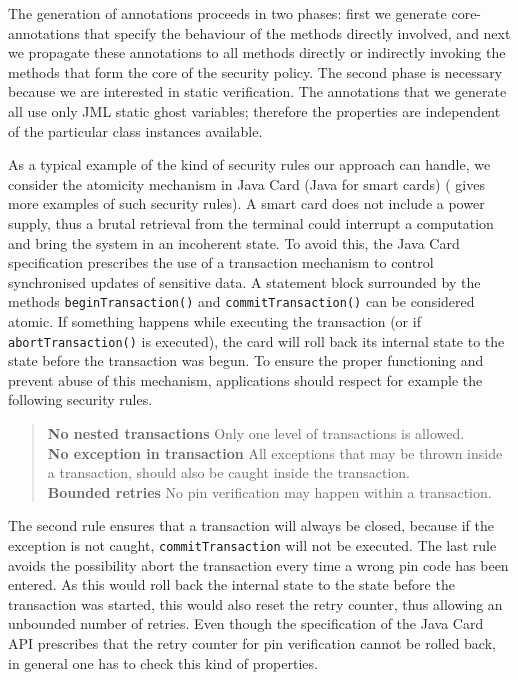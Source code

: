 The generation of annotations proceeds in two phases: first we
generate core-annotations that specify the behaviour of the methods
directly involved, and next we propagate these annotations to all
methods directly or indirectly invoking the methods that form the core
of the security policy. The second phase is necessary because we are
interested in static verification. The annotations that we generate
all use only JML static ghost variables; therefore the properties are
independent of the particular class instances available. 

As a typical example of the kind of security rules our approach can
handle, we consider the atomicity mechanism in Java Card (Java for
smart cards) (\cite{PavlovaBBHL04cardis} gives more examples of such
security rules). A smart card does not include a power supply, thus a
brutal retrieval from the terminal could interrupt a computation and
bring the system in an incoherent state. To avoid this, the Java Card
specification prescribes the use of a transaction mechanism to control
synchronised updates of sensitive data. A statement block surrounded
by the methods \texttt{beginTransaction()} and
\texttt{commitTransaction()} can be considered atomic.
If something happens while executing the transaction (or if
\texttt{abortTransaction()} is executed), the card will
roll back its internal state to the state before the transaction was
begun. To ensure the proper functioning and prevent abuse of this
mechanism, applications should respect for example the following
security rules. 

\begin{quote}
\textbf{No nested transactions} Only one level of transactions
is allowed.\smallskip\\
\textbf{No exception in transaction} All exceptions that may be thrown
inside a transaction, should also be caught inside the
transaction.\smallskip\\
\textbf{Bounded retries}
No pin verification may happen within a transaction.
\end{quote} 
The second rule ensures that a transaction will always be closed,
because if the exception is not caught, \texttt{commitTransaction}
will not be executed. The last rule avoids the possibility abort the
transaction every time a wrong pin code has been entered. As this
would roll back the internal state to the state before the transaction was
started, this would also reset the retry counter, thus allowing an
unbounded number of retries. Even though the specification of the Java
Card API prescribes that the retry counter for pin verification cannot
be rolled back, in general one has to check this kind of properties.


